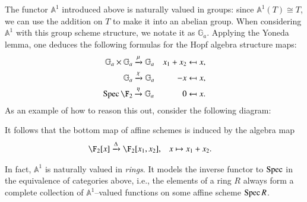 \begin{example}\label{InformalAdditiveGroupExample}
The functor $\mathbb A^1$ introduced above is naturally valued in groups: since $\mathbb A^1(T) \cong T$, we can use the addition on $T$ to make it into an abelian group.  When considering $\mathbb A^1$ with this group scheme structure, we notate it as $\mathbb G_a$.  Applying the Yoneda lemma, one deduces the following formulas for the Hopf algebra structure maps:
\begin{align*}
\mathbb G_a \times \mathbb G_a & \xrightarrow{\mu} \mathbb G_a & x_1 + x_2 & \mapsfrom x, \\
\mathbb G_a & \xrightarrow{\chi} \mathbb G_a & -x & \mapsfrom x, \\
\Spec \F_2 & \xrightarrow{\eta} \mathbb G_a & 0 & \mapsfrom x.
\end{align*}
As an example of how to reason this out, consider the following diagram:
\begin{center}
\end{center}
It follows that the bottom map of affine schemes is induced by the algebra map
\begin{align*}
\F_2[x] & \xrightarrow{\Delta} \F_2[x_1, x_2], &
x & \mapsto x_1 + x_2.
\end{align*}
\end{example}

\begin{remark}
In fact, $\mathbb A^1$ is naturally valued in \emph{rings}. It models the inverse functor to $\operatorname{Spec}$ in the equivalence of categories above, i.e., the elements of a ring $R$ always form a complete collection of $\mathbb A^1$--valued functions on some affine scheme $\operatorname{Spec} R$.
\end{remark}

